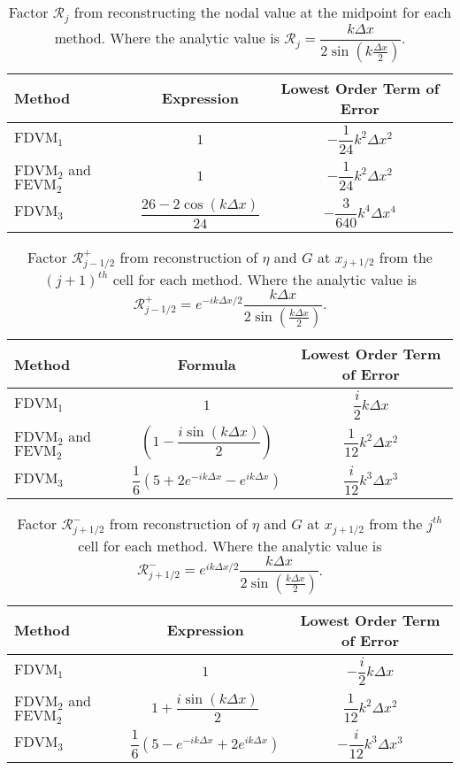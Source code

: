 \begin{table}
	\centering
	\begin{tabular}{l  c  c}
		Method& Expression& Lowest Order Term of Error  \T\B \\
		\hline 
		$\text{FDVM}_1$ & $1$ & $-\dfrac{1}{24}k^2 \Delta x^2$ \T \B \\
		$\text{FDVM}_2$ and $\text{FEVM}_2$& $1$ & $-\dfrac{1}{24}k^2 \Delta x^2$ \T \B \\
		$\text{FDVM}_3$& $\dfrac{26 - 2 \cos\left(k \Delta x\right)}{24}$ & $-\dfrac{3}{640}k^4 \Delta x^4$ \T \B  \\
		\hline	\end{tabular}
	\caption{Factor $\mathcal{R}_j$ from reconstructing the nodal value at the midpoint for each method. Where the analytic value is $\mathcal{R}_j = \dfrac{k\Delta x}{2 \sin \left(k\frac{\Delta x}{2}\right)  }$.}
	\label{tab:Mfactor}
\end{table}
\begin{table}
	\centering
	\begin{tabular}{l  c  c}
		Method & Formula& Lowest Order Term of Error\\
		\hline
		$\text{FDVM}_1$ & $1$ & $\dfrac{i}{2}k \Delta x$ \T\B \\
		$\text{FDVM}_2$ and $\text{FEVM}_2$& $ \left(1 - \dfrac{i \sin\left(k\Delta x \right)}{2} \right)$ & $\dfrac{1}{12}k^2 \Delta x^2$  \T\B\\
		$\text{FDVM}_3$& $\dfrac{1}{6}\left({5 + 2e^{-i k {\Delta x}} - e^{i k {\Delta x}}} \right)$ & $\dfrac{i}{12}k^3 \Delta x^3$  \T\B \\
		\hline
	\end{tabular}
	\caption{Factor $\mathcal{R}^+_{j-1/2}$ from reconstruction of $\eta$ and $G$ at $x_{j+1/2}$ from the ${(j+1)^{th}}$ cell for each method. Where the analytic value is $\mathcal{R}^+_{j-1/2} =e^{-i k \Delta x/2}\dfrac{k\Delta x}{2 \sin\left(\frac{k \Delta x}{2}\right)}$. }
	\label{tab:Rpfactor}
\end{table}
\begin{table}
	\centering
	\begin{tabular}{l  c  c}
		Method& Expression& Lowest Order Term of Error  \T\B \\
		\hline
		$\text{FDVM}_1$& $1$ & $-\dfrac{i}{2}k \Delta x$  \T\B \\
		$\text{FDVM}_2$ and $\text{FEVM}_2$& $1 +  \dfrac{i \sin\left(k\Delta x \right)}{2}$ & $\dfrac{1}{12}k^2 \Delta x^2$  \T\B \\
		$\text{FDVM}_3$& $\dfrac{1}{6}\left({5 - e^{-i k {\Delta x}} +2 e^{i k {\Delta x}}} \right)$ & $-\dfrac{i}{12}k^3 \Delta x^3$  \T\B \\
		\hline
	\end{tabular}
	\caption{Factor $\mathcal{R}^-_{j+1/2}$ from reconstruction of $\eta$ and $G$ at $x_{j+1/2}$ from the ${j^{th}}$ cell for each method. Where the analytic value is $\mathcal{R}^-_{j+1/2} =e^{i k \Delta x/2} \dfrac{k\Delta x}{2 \sin\left(\frac{k \Delta x}{2}\right)}$.}
	\label{tab:Rmfactor}
\end{table}
